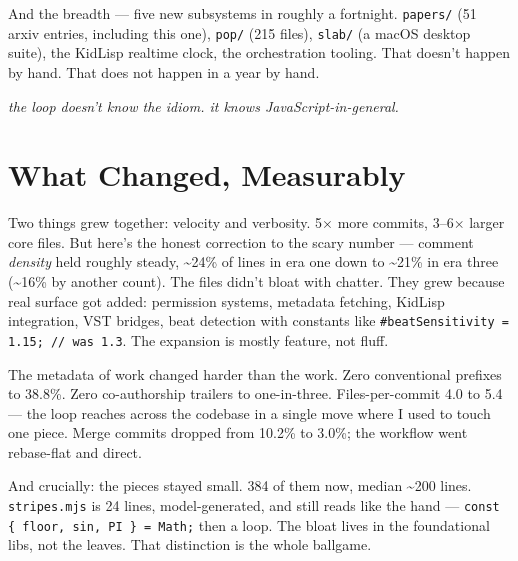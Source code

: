 \documentclass[10pt,letterpaper,twocolumn]{article}
\newcommand{\pull}[1]{%
  \par\vspace{0.4em}
  {\aclight\small\color{acpink}\itshape #1}\par
  \vspace{0.4em}}
\begin{document}
And the breadth --- five new subsystems in roughly a fortnight. \texttt{papers/} (51 arxiv entries, including this one), \texttt{pop/} (215 files), \texttt{slab/} (a macOS desktop suite), the KidLisp realtime clock, the orchestration tooling. That doesn't happen by hand. That does not happen in a year by hand.

\pull{the loop doesn't know the idiom. it knows JavaScript-in-general.}


\section{What Changed, Measurably}

Two things grew together: velocity and verbosity. 5$\times$ more commits, 3--6$\times$ larger core files. But here's the honest correction to the scary number --- comment \emph{density} held roughly steady, \textasciitilde24\% of lines in era one down to \textasciitilde21\% in era three (\textasciitilde16\% by another count). The files didn't bloat with chatter. They grew because real surface got added: permission systems, metadata fetching, KidLisp integration, VST bridges, beat detection with constants like \texttt{\#beatSensitivity = 1.15; // was 1.3}. The expansion is mostly feature, not fluff.

The metadata of work changed harder than the work. Zero conventional prefixes to 38.8\%. Zero co-authorship trailers to one-in-three. Files-per-commit 4.0 to 5.4 --- the loop reaches across the codebase in a single move where I used to touch one piece. Merge commits dropped from 10.2\% to 3.0\%; the workflow went rebase-flat and direct.

And crucially: the pieces stayed small. 384 of them now, median \textasciitilde200 lines. \texttt{stripes.mjs} is 24 lines, model-generated, and still reads like the hand --- \texttt{const \{ floor, sin, PI \} = Math;} then a loop. The bloat lives in the foundational libs, not the leaves. That distinction is the whole ballgame.
\end{document}
